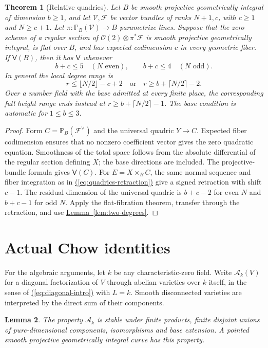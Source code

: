 \documentclass[11pt,a4paper]{article}
\newtheorem{theorem}{Theorem}[section]
\newtheorem{lemma}[theorem]{Lemma}
\theoremstyle{definition}
\theoremstyle{remark}\newtheorem{remark}[theorem]{Remark}
\numberwithin{equation}{section}
\newcommand{\PP}{\mathbb P}\newcommand{\LL}{\mathbb L}
\newcommand{\lemref}[1]{\hyperref[#1]{\textcolor{resultlink}{Lemma~\ref*{#1}}}}
\renewcommand{\eqref}[1]{\hyperref[#1]{\textcolor{equationlink}{(\ref*{#1})}}}
\begin{document}
\begin{theorem}[Relative quadrics]\label{thm:relative-quadrics}
Let $B$ be smooth projective geometrically integral of dimension
$b\geq1$, and let $\mathcal V,\mathcal F$ be vector bundles of
ranks $N+1,c$, with $c\geq1$ and $N\geq c+1$.
Let $\pi:\PP_B(\mathcal V)\to B$ parametrize lines. Suppose that
the zero scheme of a regular section of
$\mathcal O(2)\otimes\pi^*\mathcal F$ is smooth projective
geometrically integral, is flat over $B$, and has expected
codimension $c$ in every geometric fiber. If $\mathsf V(B)$,
then it has $\mathsf V$ whenever
\[
 b+c\leq5\quad(N\text{ even}),\qquad
 b+c\leq4\quad(N\text{ odd}).
\]
In general the local degree range is
\[
 r\leq\lfloor N/2\rfloor-c+2
 \quad\text{or}\quad r\geq b+\lceil N/2\rceil-2.
\]
Over a number field with the base admitted at every finite place,
the corresponding full height range ends instead at
$r\geq b+\lceil N/2\rceil-1$. The base condition is automatic
for $1\leq b\leq3$.
\end{theorem}

\begin{proof}
Form $C=\PP_B(\mathcal F^\vee)$ and the universal quadric
$Y\to C$. Expected fiber codimension ensures that no nonzero
coefficient vector gives the zero quadratic equation. Smoothness
of the total space follows from the absolute differential of the
regular section defining $X$; the base directions are included.
The projective-bundle formula gives $\mathsf V(C)$. For
$E=X\times_BC$, the same normal sequence and fiber integration
as in \eqref{eq:quadrics-retraction} give a signed retraction with
shift $c-1$. The residual dimension of the universal quadric is
$b+c-2$ for even $N$ and $b+c-1$ for odd $N$. Apply the
flat-fibration theorem, transfer through the retraction, and use
\lemref{lem:two-degrees}.
\end{proof}



\section{Actual Chow identities}\label{sec:chow}

For the algebraic arguments, let $k$ be any characteristic-zero
field. Write $\mathcal A_k(V)$ for a diagonal factorization of $V$
through abelian varieties over $k$ itself, in the sense of
\eqref{eq:diagonal-intro} with $L=k$. Smooth disconnected varieties
are interpreted by the direct sum of their components.

\begin{lemma}\label{lem:tensor}
The property $\mathcal A_k$ is stable under finite products, finite
disjoint unions of pure-dimensional components, isomorphisms and
base extension. A pointed smooth projective geometrically integral
curve has this property.
\end{lemma}
\end{document}
